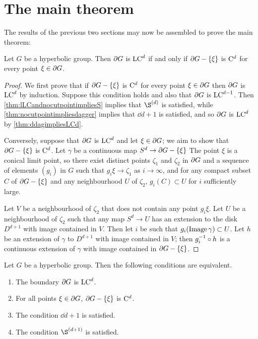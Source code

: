 \documentclass[a4paper]{article}
\begin{document}
\section{The main theorem}\label{sec:assembling}

The results of the previous two sections may now be assembled to prove the main 
theorem:

\begin{theorem}\label{thm:maintheorem}
  Let $G$ be a hyperbolic group. Then $\partial G$ is $\mathrm{LC}^{d}$ if and only if 
  $\partial G - \left\{\xi\right\}$ is $\mathrm{C}^{d}$ for every point $\xi \in \partial G$.
\end{theorem}

\begin{proof}
  We first prove that if $\partial G - \left\{\xi\right\}$ is $\mathrm{C}^{d}$ for every point $\xi 
  \in \partial G$ then $\partial G$ is $\mathrm{LC}^{d}$ by induction. Suppose this 
  condition holds and also that $\partial G$ is $\mathrm{LC}^{d-1}$. Then 
  \cref{thm:lLCandnocutpointimpliesS} implies that $\Sd{d}$ is 
  satisfied, while \cref{thm:nocutpointimpliesdagger} implies that 
  $\dd{d+1}$ is satisfied, and so $\partial G$ is $\mathrm{LC}^{d}$ by 
  \cref{thm:ddagimpliesLCd}.

  Conversely, suppose that $\partial G$ is $\mathrm{LC}^{d}$ and let $\xi \in \partial 
  G$; we aim to show that $\partial G - \left\{\xi\right\}$ is $\mathrm{C}^{d}$. Let $\gamma$ be a 
  continuous map $S^d \to \partial G - \left\{\xi\right\}$ The point $\xi$ is a conical 
  limit point, so there exist distinct points $\zeta_1$ and $\zeta_2$ in 
  $\partial G$ and a sequence of elements $(g_i)$ in $G$ such that $g_i\xi \to 
  \zeta_1$ as $i\to \infty$, and for any compact subset $C$ of $\partial G - 
  \left\{\xi\right\}$ and any neighbourhood $U$ of $\zeta_2$, $g_i(C) \subset U$ for $i$ 
  sufficiently large.

  Let $V$ be a neighbourhood of $\zeta_2$ that does not contain any point 
  $g_i\xi$.  Let $U$ be a neighbourhood of $\zeta_2$ such that any map $S^d \to 
  U$ has an extension to the disk $D^{d+1}$ with image contained in $V$. Then 
  let $i$ be such that $g_i(\operatorname{Image}\gamma)\subset U$. Let $h$ be an extension of 
  $\gamma$ to $D^{d+1}$ with image contained in $V$; then $g_i^{-1}\circ h$ 
  is a continuous extension of $\gamma$ with image contained in $\partial G - 
  \left\{\xi\right\}$.
\end{proof}

\begin{corollary}
  Let $G$ be a hyperbolic group. Then the following conditions are equivalent.
  \begin{enumerate}
    \item\label{item:LCd} The boundary $\partial G$ is $\mathrm{LC}^{d}$.
    \item\label{item:Cd} For all points $\xi \in \partial G$, $\partial G - 
      \left\{\xi\right\}$ is $\mathrm{C}^{d}$.
    \item\label{item:dd} The condition $\dd{d+1}$ is satisfied.
    \item\label{item:Sd} The condition $\Sd{d+1}$ is satisfied.
  \end{enumerate}
\end{corollary}
\end{document}
